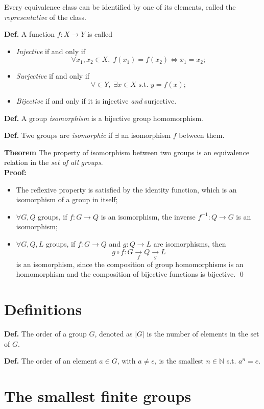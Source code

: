 Every equivalence class can be identified by one of its elements, called the
\textit{representative} of the class.

\textbf{Def.} A function $f:X\rightarrow Y$ is called
\begin{itemize}
    \item \textit{Injective} if and only if
	$$\forall x_1,x_2\in X,\;f(x_1)=f(x_2)\iff x_1=x_2;$$
    \item \textit{Surjective} if and only if
	$$\forall \in Y,\;\exists x\in X \text{ s.t. } y = f(x);$$
    \item \textit{Bijective} if and only if it is injective \textit{and} surjective.
\end{itemize}

\textbf{Def.} A group \textit{isomorphism} is a bijective group homomorphism.

\textbf{Def.} Two groups are \textit{isomorphic} if $\exists$ an isomorphism $f$
between them.

\textbf{Theorem} The property of isomorphism between two groups is an equivalence
relation in the \textit{set of all groups}.\\
\textbf{Proof:}
\begin{itemize}
    \item The reflexive property is satisfied by the identity function, which is
an isomorphism of a group in itself;
    \item $\forall G,Q$ groups, if $f: G\rightarrow Q$ is an isomorphism, the inverse
    $f^{-1}:Q\rightarrow G$ is an isomorphism;
\item $\forall G,Q,L$ groups, if $f:G\rightarrow Q$ and $g:Q\rightarrow L$ are
    isomorphisms, then
    $$g\circ f: G \underset{f}\rightarrow Q \underset{g}\rightarrow L$$
    is an isomorphism, since the composition of group homomorphisms is an homomorphism
    and the composition of bijective functions is bijective. \qed
\end{itemize}
\section{Definitions}
\textbf{Def.} The order of a group $G$, denoted as $|G|$ is the number of elements
in the set of $G$.

\textbf{Def.} The order of an element $a\in G$, with $a\neq e$, is the smallest
$n\in\mathbb{N}$ s.t. $a^n=e$.

\section{The smallest finite groups}
